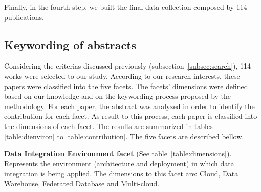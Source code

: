 Finally, in the fourth step, we built the final data collection composed by 114 publications.

\subsection{Keywording of abstracts}

Considering the criterias discussed previously (subsection~\ref{subsec:search}),
114 works were selected to our study. 
According to our research interests, these papers were classified into the five facets. 
The facets' dimensions were defined based on our knowledge and on the keywording process proposed by the
methodology.   
For each paper, the abstract
was analyzed in order to identify the contribution for each facet.
As result to this process, each paper is classified into the dimensions of each facet. 
The results are summarized in tables \ref{table:dienviron} to \ref{table:contribution}. 
The five facets are described bellow.

\textbf{Data Integration Environment facet} (See table~\ref{table:dimensions}). 
Represents the environment (architecture and deployment) in which data integration is being applied.
The dimensions to this facet are: Cloud, Data Warehouse, Federated Database and Multi-cloud.


